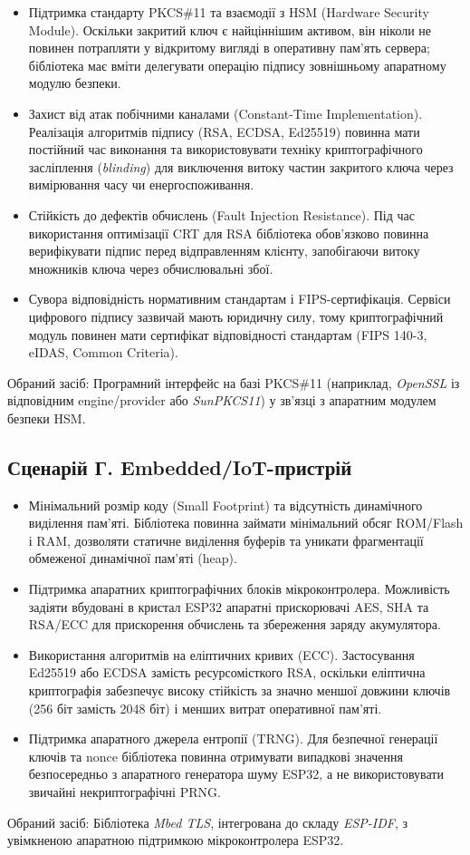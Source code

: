 \begin{itemize}
    \item Підтримка стандарту PKCS\#11 та взаємодії з HSM (Hardware Security Module). Оскільки закритий ключ є найціннішим активом, він ніколи не повинен потрапляти у відкритому вигляді в оперативну пам'ять сервера; бібліотека має вміти делегувати операцію підпису зовнішньому апаратному модулю безпеки.
    \item Захист від атак побічними каналами (Constant-Time Implementation). Реалізація алгоритмів підпису (RSA, ECDSA, Ed25519) повинна мати постійний час виконання та використовувати техніку криптографічного засліплення (\textit{blinding}) для виключення витоку частин закритого ключа через вимірювання часу чи енергоспоживання.
    \item Стійкість до дефектів обчислень (Fault Injection Resistance). Під час використання оптимізації CRT для RSA бібліотека обов'язково повинна верифікувати підпис перед відправленням клієнту, запобігаючи витоку множників ключа через обчислювальні збої.
    \item Сувора відповідність нормативним стандартам і FIPS-сертифікація. Сервіси цифрового підпису зазвичай мають юридичну силу, тому криптографічний модуль повинен мати сертифікат відповідності стандартам (FIPS 140-3, eIDAS, Common Criteria).
\end{itemize}

Обраний засіб: Програмний інтерфейс на базі PKCS\#11 (наприклад, \textit{OpenSSL} із відповідним engine/provider або \textit{SunPKCS11}) у зв'язці з апаратним модулем безпеки HSM.

\subsection{Сценарій Г. Embedded/IoT-пристрій}

\begin{itemize}
    \item Мінімальний розмір коду (Small Footprint) та відсутність динамічного виділення пам'яті. Бібліотека повинна займати мінімальний обсяг ROM/Flash і RAM, дозволяти статичне виділення буферів та уникати фрагментації обмеженої динамічної пам'яті (heap).
    \item Підтримка апаратних криптографічних блоків мікроконтролера. Можливість задіяти вбудовані в кристал ESP32 апаратні прискорювачі AES, SHA та RSA/ECC для прискорення обчислень та збереження заряду акумулятора.
    \item Використання алгоритмів на еліптичних кривих (ECC). Застосування Ed25519 або ECDSA замість ресурсомісткого RSA, оскільки еліптична криптографія забезпечує високу стійкість за значно меншої довжини ключів (256 біт замість 2048 біт) і менших витрат оперативної пам'яті.
    \item Підтримка апаратного джерела ентропії (TRNG). Для безпечної генерації ключів та nonce бібліотека повинна отримувати випадкові значення безпосередньо з апаратного генератора шуму ESP32, а не використовувати звичайні некриптографічні PRNG.
\end{itemize}

Обраний засіб: Бібліотека \textit{Mbed TLS}, інтегрована до складу \textit{ESP-IDF}, з увімкненою апаратною підтримкою мікроконтролера ESP32.
